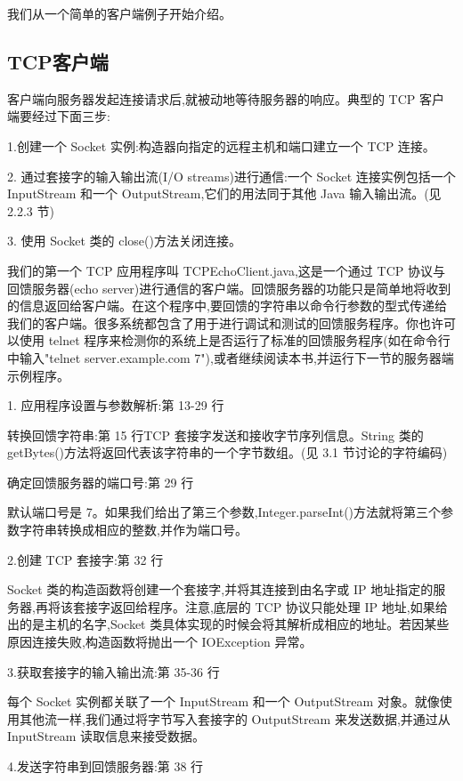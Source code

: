 		我们从一个简单的客户端例子开始介绍。

		\subsection{TCP客户端}

		客户端向服务器发起连接请求后,就被动地等待服务器的响应。典型的 TCP 客户端要经过下面三步:

		1.创建一个 Socket 实例:构造器向指定的远程主机和端口建立一个 TCP 连接。

		2. 通过套接字的输入输出流(I/O streams)进行通信:一个 Socket 连接实例包括一个InputStream 和一个 OutputStream,它们的用法同于其他 Java 输入输出流。(见 2.2.3 节)

		3. 使用 Socket 类的 close()方法关闭连接。

		我们的第一个 TCP 应用程序叫 TCPEchoClient.java,这是一个通过 TCP 协议与回馈服务器(echo server)进行通信的客户端。回馈服务器的功能只是简单地将收到的信息返回给客户端。在这个程序中,要回馈的字符串以命令行参数的型式传递给我们的客户端。很多系统都包含了用于进行调试和测试的回馈服务程序。你也许可以使用 telnet 程序来检测你的系统上是否运行了标准的回馈服务程序(如在命令行中输入"telnet server.example.com 7"),或者继续阅读本书,并运行下一节的服务器端示例程序。

		

		1. 应用程序设置与参数解析:第 13-29 行

		转换回馈字符串:第 15 行TCP 套接字发送和接收字节序列信息。String 类的 getBytes()方法将返回代表该字符串的一个字节数组。(见 3.1 节讨论的字符编码)

		确定回馈服务器的端口号:第 29 行

		默认端口号是 7。如果我们给出了第三个参数,Integer.parseInt()方法就将第三个参数字符串转换成相应的整数,并作为端口号。

		2.创建 TCP 套接字:第 32 行

		Socket 类的构造函数将创建一个套接字,并将其连接到由名字或 IP 地址指定的服务器,再将该套接字返回给程序。注意,底层的 TCP 协议只能处理 IP 地址,如果给出的是主机的名字,Socket 类具体实现的时候会将其解析成相应的地址。若因某些原因连接失败,构造函数将抛出一个 IOException 异常。

		3.获取套接字的输入输出流:第 35-36 行

		每个 Socket 实例都关联了一个 InputStream 和一个 OutputStream 对象。就像使用其他流一样,我们通过将字节写入套接字的 OutputStream 来发送数据,并通过从 InputStream 读取信息来接受数据。

		4.发送字符串到回馈服务器:第 38 行

